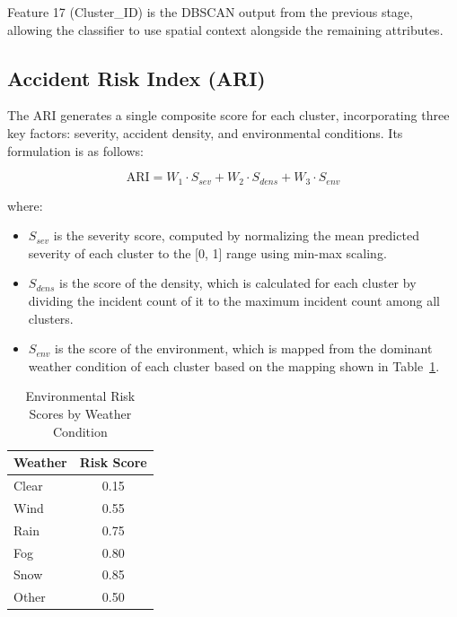 \documentclass[conference]{IEEEtran}
\begin{document}
Feature 17 (Cluster\_ID) is the DBSCAN output from the previous stage, allowing the classifier to use spatial context alongside the remaining attributes.

\subsection{Accident Risk Index (ARI)}

The ARI generates a single composite score for each cluster, incorporating three key factors: severity, accident density, and environmental conditions. Its formulation is as follows:

\begin{equation}
\text{ARI} = W_1 \cdot S_{sev} + W_2 \cdot S_{dens} + W_3 \cdot S_{env}
\label{eq:ari}
\end{equation}

\noindent where:

\begin{itemize}
\item $S_{sev}$ is the severity score, computed by normalizing the mean predicted severity of each cluster to the [0, 1] range using min-max scaling.
\item $S_{dens}$ is the score of the density, which is calculated for each cluster by dividing the incident count of it to the maximum incident count among all clusters.
\item $S_{env}$ is the score of the environment, which is mapped from the dominant weather condition of each cluster based on the mapping shown in Table~\ref{tab:env_scores}.
\end{itemize}

\begin{table}[htbp]
\caption{Environmental Risk Scores by Weather Condition}
\begin{center}
\begin{tabular}{lc}
\toprule
\textbf{Weather} & \textbf{Risk Score} \\
\midrule
Clear & 0.15 \\
Wind & 0.55 \\
Rain & 0.75 \\
Fog & 0.80 \\
Snow & 0.85 \\
Other & 0.50 \\
\bottomrule
\end{tabular}
\label{tab:env_scores}
\end{center}
\end{table}
\end{document}
